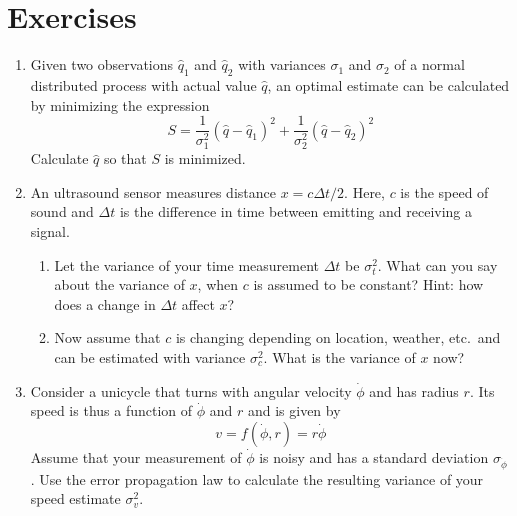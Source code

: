\section*{Exercises}\small
\begin{enumerate}
\item Given two observations $\hat{q}_1$ and $\hat{q}_2$ with variances $\sigma_1$ and $\sigma_2$ of a normal distributed process with actual value $\hat{q}$, an optimal estimate can be calculated by minimizing the expression
\begin{equation}
\nonumber
S=\frac{1}{\sigma_1^2}(\hat{q}-\hat{q}_1)^2+\frac{1}{\sigma_2^2}(\hat{q}-\hat{q}_2)^2
\end{equation}
Calculate $\hat{q}$ so that $S$ is minimized.
\item An ultrasound sensor measures distance $x=c\Delta t/2$. Here, $c$ is the speed of sound and $\Delta t$ is the difference in time between emitting and receiving a signal.
\begin{enumerate}
\item Let the variance of your time measurement $\Delta t$ be $\sigma_t^2$. What can you say about the variance of $x$, when $c$ is assumed to be constant? Hint: how does a change in $\Delta t$ affect $x$?
\item Now assume that $c$ is changing depending on location, weather, etc.\ and can be estimated with variance $\sigma_c^2$. What is the variance of $x$ now?
\end{enumerate}
\item Consider a unicycle that turns with angular velocity $\dot{\phi}$ and has radius $r$. Its speed is thus a function of $\dot{\phi}$ and $r$ and is given by
\begin{equation}
\nonumber
v=f(\dot{\phi},r)=r\dot{\phi}
\end{equation}
Assume that your measurement of $\dot{\phi}$ is noisy and has a standard deviation $\sigma_{\dot{\phi}}$.  Use the error propagation law to calculate the resulting variance of your speed estimate $\sigma_v^2$.
\end{enumerate}
\normalsize
